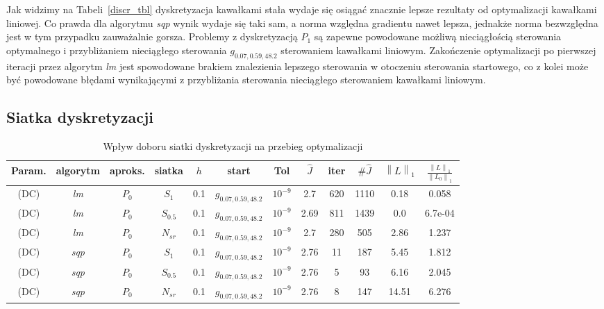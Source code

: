 \documentclass[licencjacka]{pracamgr}
\newcommand{\norm}[1]{\left\lVert#1\right\rVert}
\begin{document}
Jak widzimy na Tabeli~\ref{discr_tbl} dyskretyzacja kawałkami stała wydaje się osiągać znacznie lepsze rezultaty od optymalizacji kawałkami liniowej. Co prawda dla algorytmu {\it sqp\/} wynik wydaje się taki sam, a norma względna gradientu nawet lepsza, jednakże norma bezwzględna jest w tym przypadku zauważalnie gorsza. Problemy z dyskretyzacją $P_1$ są zapewne powodowane możliwą nieciągłością sterowania optymalnego i przybliżaniem nieciągłego sterowania $g_{0.07,0.59,48.2}$ sterowaniem kawałkami liniowym. Zakończenie optymalizacji po pierwszej iteracji przez algorytm {\it lm\/} jest spowodowane brakiem znalezienia lepszego sterowania w otoczeniu sterowania startowego, co z kolei może być powodowane błędami wynikającymi z przybliżania sterowania nieciągłego sterowaniem kawałkami liniowym.

\subsection{Siatka dyskretyzacji}

\begin{table}[h!]
  \begin{center}
    \begin{tabular}{|c|c|c|c|c|c|c||c|c|c|c|c|}
      \hline
      Param. & algorytm & aproks. & siatka & $h$ & start & Tol & $\hat{J}$ & iter & $\#\hat{J}$ & $\norm{L}_1$ & $\frac{\norm{L}_1}{\norm{L_0}_1}$ \\
      \hline
      (DC) & {\it lm\/} & $P_0$ & $S_1$ & 0.1 & $g_{0.07,0.59,48.2}$ & $10^{-9}$ & 2.7 & 620 & 1110 & 0.18 & 0.058 \\
      \hline
      (DC) & {\it lm\/} & $P_0$ & $S_{0.5}$ & 0.1 & $g_{0.07,0.59,48.2}$ & $10^{-9}$ & 2.69 & 811 & 1439 & 0.0 & 6.7e-04 \\
      
      \hline
      (DC) & {\it lm\/} & $P_0$ & $N_{sr}$ & 0.1 & $g_{0.07,0.59,48.2}$ & $10^{-9}$ & 2.7 & 280 & 505 & 2.86 & 1.237 \\
      \hline
      (DC) & {\it sqp\/} & $P_0$ & $S_1$ & 0.1 & $g_{0.07,0.59,48.2}$ & $10^{-9}$ & 2.76 & 11 & 187 & 5.45 & 1.812 \\
      \hline
      (DC) & {\it sqp\/} & $P_0$ & $S_{0.5}$ & 0.1 & $g_{0.07,0.59,48.2}$ & $10^{-9}$ & 2.76 & 5 & 93 & 6.16 & 2.045 \\
      \hline
      (DC) & {\it sqp\/} & $P_0$ & $N_{sr}$ & 0.1 & $g_{0.07,0.59,48.2}$ & $10^{-9}$ & 2.76 & 8 & 147 & 14.51 & 6.276 \\
      \hline
    \end{tabular}
    \caption{Wpływ doboru siatki dyskretyzacji na przebieg optymalizacji}\label{grid_tbl}
  \end{center}
\end{table}
\end{document}
